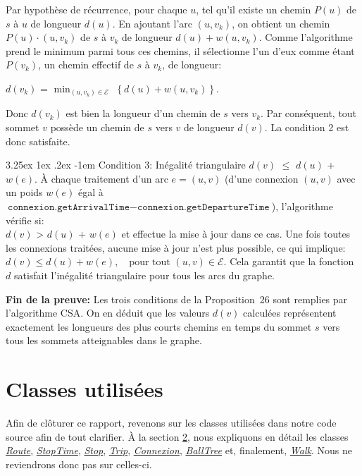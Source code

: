 \documentclass[12pt]{article}
\makeatletter
\renewcommand\paragraph{\@startsection{paragraph}{5}{\z@}%
  {3.25ex \@plus1ex \@minus.2ex}%
  {-1em}%
  {\normalfont\normalsize\bfseries}}
\makeatother
\begin{document}
Par hypothèse de récurrence, pour chaque $u$, tel qu'il existe un chemin $P(u)$ de $s$ à $u$ de longueur $d(u)$. En ajoutant l'arc $(u, v_k)$, on obtient un chemin
$P(u) \cdot (u, v_k)$ de $s$ à $v_k$ de longueur $d(u) + w(u, v_k)$. Comme l'algorithme prend le minimum parmi tous ces chemins, il sélectionne l'un 
d'eux comme étant $P(v_k)$, un chemin effectif de $s$ à $v_k$, de longueur:

$d(v_k)$ = $\min_{(u, v_k) \in \mathcal{E}}$ $\left\{ d(u) + w(u, v_k) \right\}$.


Donc $d(v_k)$ est bien la longueur d'un chemin de $s$ vers $v_k$. Par conséquent, tout sommet $v$ possède un chemin de $s$ vers $v$ de 
longueur $d(v)$. La condition 2 est donc satisfaite.

\paragraph{Condition 3:}
Inégalité triangulaire $d(v)$ $\leq$ $d(u)$ + $w(e)$.
À chaque traitement d'un arc $e = (u, v)$ (d'une connexion $(u, v)$ avec un poids $w(e)$ égal à $\texttt{connexion.getArrivalTime} - \texttt{connexion.getDepartureTime}$),
l'algorithme vérifie si:\\
$d(v)$ > $d(u)$ + $w(e)$
et effectue la mise à jour dans ce cas. Une fois toutes les connexions traitées, aucune mise à jour n'est plus possible, ce qui implique:
$d(v) \leq d(u) + w(e),\quad \text{pour tout } (u, v) \in \mathcal{E}$.
Cela garantit que la fonction $d$ satisfait l'inégalité triangulaire pour tous les arcs du graphe.

\textbf{Fin de la preuve:} 
Les trois conditions de la Proposition~26 sont remplies par l'algorithme CSA. On en déduit que les valeurs $d(v)$ 
calculées représentent exactement les longueurs des plus courts chemins en temps du sommet $s$ vers tous les sommets atteignables dans le graphe.


\section{Classes utilisées}
Afin de clôturer ce rapport, revenons sur les classes utilisées dans notre code source afin de tout clarifier. À la section \hyperref[sec:init]{2}, nous expliquons
en détail les classes \hyperref[sec:route]{\emph{Route}}, \hyperref[sec:stoptime]{\emph{StopTime}}, \hyperref[sec:stop]{\emph{Stop}}, \hyperref[sec:trip]{\emph{Trip}},
\hyperref[sec:connexion]{\emph{Connexion}}, \hyperref[sec:balltree]{\emph{BallTree}} et, finalement, \hyperref[sec:walk]{\emph{Walk}}. Nous ne reviendrons donc pas sur
celles-ci.
\end{document}
